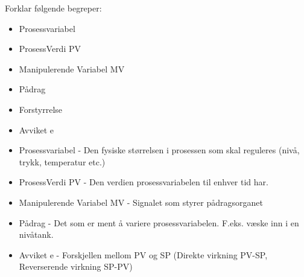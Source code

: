 

Forklar  følgende begreper:

\begin{itemize}
\item Prosessvariabel
\item ProsessVerdi PV 
\item Manipulerende Variabel MV
\item Pådrag 
\item Forstyrrelse 
\item Avviket e 
\end{itemize}









\begin{itemize}
\item Prosessvariabel - Den fysiske størrelsen i prosessen som skal reguleres (nivå, trykk, temperatur etc.)
\item ProsessVerdi PV - Den verdien prosessvariabelen til enhver tid har.
\item Manipulerende Variabel MV - Signalet som styrer pådragsorganet
\item Pådrag - Det som er ment å variere prosessvariabelen. F.eks. væske inn i en nivåtank. 
\item Avviket e - Forskjellen mellom PV og SP (Direkte virkning PV-SP, Reverserende virkning SP-PV)
\end{itemize}











